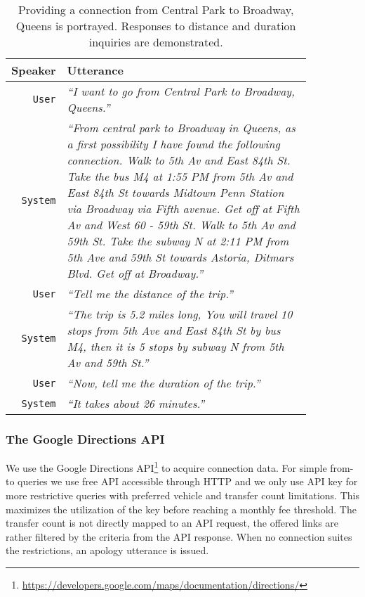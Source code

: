 \begin{table}[h]
\centering
\begin{tabular}{ | r | p{0.85\linewidth} | } \hline
	\textbf{Speaker} & \textbf{Utterance} \\ \hline
	\texttt{User} & \textit{``I want to go from Central Park to Broadway, Queens.''} \\ \hline
	\texttt{System} & \textit{``From central park to Broadway in Queens, as a first possibility
	I have found the following connection.
	Walk to 5th Av and East 84th St. 
	Take the bus M4 at 1:55 PM from 5th Av and East 84th St towards Midtown Penn Station via Broadway via Fifth avenue.
	Get off at Fifth Av and West 60 - 59th St. Walk to 5th Av and 59th St.
	Take the subway N at 2:11 PM from 5th Ave and 59th St towards Astoria, Ditmars Blvd. 
	Get off at Broadway.''} \\ \hline
	\texttt{User} & \textit{``Tell me the distance of the trip.''} \\ \hline
	\texttt{System} & \textit{``The trip is 5.2 miles long, You will travel 10 stops from 5th Ave and East 84th St by bus M4, then it is 5 stops by subway N from 5th Av and 59th St.''} \\ \hline
	\texttt{User} & \textit{``Now, tell me the duration of the trip.''} \\ \hline
	\texttt{System} & \textit{``It takes about 26 minutes.''} \\ \hline
\end{tabular}
\caption[Particular connection with distance and duration inquiries]{Providing a connection from Central Park to Broadway, Queens is portrayed. Responses to distance and duration inquiries are demonstrated.}
\label{table:distance}
\end{table}

\subsubsection{The Google Directions \ac{API}}

We use the Google Directions \ac{API}\footnote{\url{https://developers.google.com/maps/documentation/directions/}} to acquire connection data.
For simple from-to queries we use free \ac{API} accessible through HTTP and we only use \ac{API} key for more restrictive queries with preferred vehicle and transfer count limitations.
This maximizes the utilization of the key before reaching a monthly fee threshold.
The transfer count is not directly mapped to an \ac{API} request, the offered links are rather filtered by the criteria from the \ac{API} response.
When no connection suites the restrictions, an apology utterance is issued.

